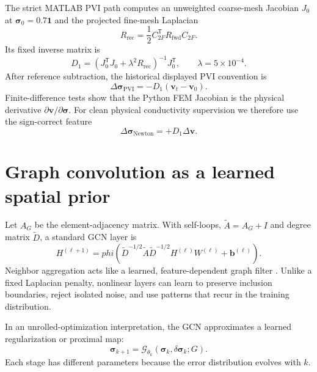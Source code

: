 \documentclass[11pt]{article}
\newcommand{\trans}{^{\mathsf T}}
\newcommand{\sig}{\bm{\sigma}}
\newcommand{\dv}{\Delta\bm{v}}
\newcommand{\dsig}{\Delta\bm{\sigma}}
\begin{document}
The strict MATLAB PVI path computes an unweighted coarse-mesh Jacobian $J_0$ at
$\sig_0=0.7\bm1$ and the projected fine-mesh Laplacian
\begin{equation}
  R_{\mathrm{rec}}=\frac12 C_{2F}\trans R_{\mathrm{fwd}}C_{2F}.
\end{equation}
Its fixed inverse matrix is
\begin{equation}
  D_1=(J_0\trans J_0+\lambda^2R_{\mathrm{rec}})^{-1}J_0\trans,
  \qquad \lambda=5\times10^{-4}.
\end{equation}
After reference subtraction, the historical displayed PVI convention is
\begin{equation}
  \dsig_{\mathrm{PVI}}=-D_1(\bm v_t-\bm v_0).
  \label{eq:pvi-display}
\end{equation}
Finite-difference tests show that the Python FEM Jacobian is the physical derivative
$\partial\bm v/\partial\sig$.  For clean physical conductivity supervision we
therefore use the sign-correct feature
\begin{equation}
  \dsig_{\mathrm{Newton}}=+D_1\dv.
  \label{eq:physical-newton}
\end{equation}

\section{Graph convolution as a learned spatial prior}

Let $A_G$ be the element-adjacency matrix.  With self-loops,
$\widetilde A=A_G+I$ and degree matrix $\widetilde D$, a standard GCN layer is
\begin{equation}
  H^{(\ell+1)}=phi\left(
  \widetilde D^{-1/2}\widetilde A\widetilde D^{-1/2}
  H^{(\ell)}W^{(\ell)}+\bm b^{(\ell)}
  \right).
  \label{eq:gcn}
\end{equation}
Neighbor aggregation acts like a learned, feature-dependent graph filter
\cite{kipf2017,fey2019}.  Unlike a fixed Laplacian penalty, nonlinear layers can
learn to preserve inclusion boundaries, reject isolated noise, and use patterns
that recur in the training distribution.

In an unrolled-optimization interpretation, the GCN approximates a learned
regularization or proximal map:
\begin{equation}
  \sig_{k+1}=\mathcal G_{\theta_k}
  \left(\sig_k,\delta\sig_k;G\right).
  \label{eq:learned-update}
\end{equation}
Each stage has different parameters because the error distribution evolves with
$k$.
\end{document}
